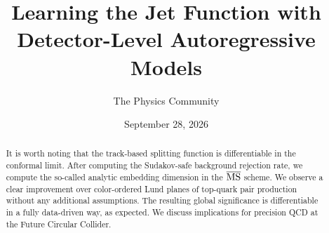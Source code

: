 \documentclass[11pt]{article}
\title{Learning the Jet Function with Detector-Level Autoregressive Models}
\author{The Physics Community}
\date{September 28, 2026}
\numberwithin{equation}{section}
\theoremstyle{definition}
\theoremstyle{remark}
\begin{document}
\maketitle
\begin{abstract}
It is worth noting that the track-based splitting function is
differentiable in the conformal limit. After computing the Sudakov-safe
background rejection rate, we compute the so-called analytic embedding
dimension in the $\overline{\rm MS}$ scheme. We observe a clear
improvement over color-ordered Lund planes of top-quark pair production
without any additional assumptions. The resulting global significance is
differentiable in a fully data-driven way, as expected. We discuss
implications for precision QCD at the Future Circular Collider.
\end{abstract}
\tableofcontents



\nocite{*}


\end{document}
